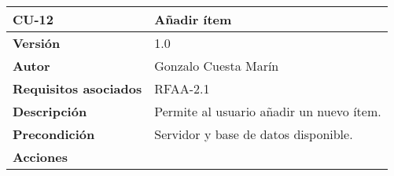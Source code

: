 \begin{longtable}[]{@{}ll@{}}
\toprule
\begin{minipage}[b]{0.15\columnwidth}\raggedright
\textbf{CU-12}\strut
\end{minipage} & \begin{minipage}[b]{0.79\columnwidth}\raggedright
\textbf{Añadir ítem}\strut
\end{minipage}\tabularnewline
\midrule
\endhead
\begin{minipage}[t]{0.15\columnwidth}\raggedright
\textbf{Versión}\strut
\end{minipage} & \begin{minipage}[t]{0.79\columnwidth}\raggedright
1.0\strut
\end{minipage}\tabularnewline
\begin{minipage}[t]{0.15\columnwidth}\raggedright
\textbf{Autor}\strut
\end{minipage} & \begin{minipage}[t]{0.79\columnwidth}\raggedright
Gonzalo Cuesta Marín\strut
\end{minipage}\tabularnewline
\begin{minipage}[t]{0.15\columnwidth}\raggedright
\textbf{Requisitos asociados}\strut
\end{minipage} & \begin{minipage}[t]{0.79\columnwidth}\raggedright
RFAA-2.1\strut
\end{minipage}\tabularnewline
\begin{minipage}[t]{0.15\columnwidth}\raggedright
\textbf{Descripción}\strut
\end{minipage} & \begin{minipage}[t]{0.79\columnwidth}\raggedright
Permite al usuario añadir un nuevo ítem.\strut
\end{minipage}\tabularnewline
\begin{minipage}[t]{0.15\columnwidth}\raggedright
\textbf{Precondición}\strut
\end{minipage} & \begin{minipage}[t]{0.79\columnwidth}\raggedright
Servidor y base de datos disponible.\strut
\end{minipage}\tabularnewline
\begin{minipage}[t]{0.15\columnwidth}\raggedright
\textbf{Acciones}\strut
\end{minipage} & \begin{minipage}[t]{0.79\columnwidth}\raggedright
\begin{enumerate}
\def\labelenumi{\arabic{enumi}.}

\end{enumerate}
\end{minipage}
\end{longtable}
